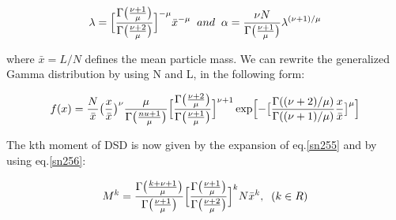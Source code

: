 \begin{eqnarray}
\lambda=\Bigl[\frac{\Gamma\bigl(\frac{\nu+1}{\mu}\bigr)}{\Gamma\bigl(\frac{\nu+2}{\mu}\bigr)}\Bigr]^{-\mu}\bar{x}^{-\mu}\;\;and\;\;\alpha=\frac{\nu N}{\Gamma\bigl(\frac{\nu+1}{\mu}\bigr)}\lambda^{(\nu+1)/\mu}\label{sn256}
\end{eqnarray}

where $\bar{x}=L/N$ defines the mean particle mass. We can rewrite the generalized Gamma distribution by using N and L, in the following form:

\begin{eqnarray}
f(x)=\frac{N}{\bar{x}}\bigl(\frac{x}{\bar{x}}\bigr)^{\nu}\frac{\mu}{\Gamma\bigl(\frac{nu+1}{\mu}\bigr)}\Bigl[\frac{\Gamma\bigl(\frac{\nu+2}{\mu}\bigr)}{\Gamma\bigl(\frac{\nu+1}{\mu}\bigr)}\Bigr]^{\nu+1}\exp\Bigl[-\bigl[\frac{\Gamma((\nu+2)/\mu)}{\Gamma((\nu+1)/\mu)}\frac{x}{\bar{x}}\bigr]^{\mu}\Bigr]\label{sn257}
\end{eqnarray}

The kth moment of DSD is now given by the expansion of eq.\ref{sn255} and by using eq.\ref{sn256}:

\begin{eqnarray}
M^{k}=\frac{\Gamma\bigl(\frac{k+\nu+1}{\mu}\bigr)}{\Gamma\bigl(\frac{\nu+1}{\mu}\bigr)}\Bigl[\frac{\Gamma\bigl(\frac{\nu+1}{\mu}\bigr)}{\Gamma\bigl(\frac{\nu+2}{\mu}\bigr)}\Bigr]^{k}N\bar{x}^{k},\;\;(k\in R)
\end{eqnarray}


